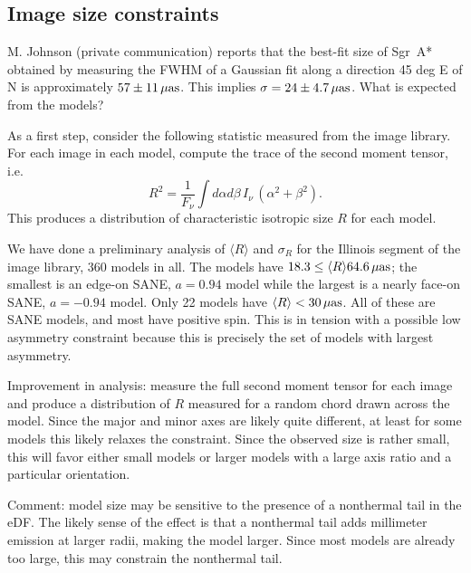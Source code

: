 \documentclass[twocolumn,tighten,dvipsnames]{aastex63}
\newcommand\sgra{Sgr~A*\xspace}
\newcommand\uas{{\rm \, \mu as}}
\newcommand\<{{\langle}}
\renewcommand\>{{\rangle}} %
\begin{document}
\subsection{Image size constraints}
\label{sec:sizeconst}

M. Johnson (private communication) reports that the best-fit size of \sgra obtained by measuring the FWHM of a Gaussian fit along a direction 45 deg E of N is approximately $57 \pm 11 \uas$.  This implies $\sigma = 24 \pm 4.7 \uas$.  What is expected from the models?

As a first step, consider the following statistic measured from the image library.  For each image in each model, compute the trace of the second moment tensor, i.e.
\begin{equation}
    R^2 = \frac{1}{F_\nu} \int d\alpha d\beta \, I_\nu \, (\alpha^2 + \beta^2).
\end{equation}
This produces a distribution of characteristic isotropic size $R$ for each model.

We have done a preliminary analysis of $\langle R \rangle$ and $\sigma_R$ for the Illinois segment of the image library, 360 models in all.  The models have  $18.3 \le \langle R \rangle 64.6 \uas$; the smallest is an edge-on SANE, $a = 0.94$ model while the largest is a nearly face-on SANE, $a = -0.94$ model.  Only 22 models have $\langle R \rangle < 30\uas$.  All of these are SANE models, and most have positive spin.  This is in tension with a possible low  asymmetry constraint because this is precisely the set of models with largest asymmetry.

Improvement in analysis: measure the full second moment tensor for each image and produce a distribution of $R$ measured for a random chord drawn across the model.  Since the major and minor axes are likely quite different, at least for some models \citep{2019ApJ...871...30I} this likely relaxes the constraint.  Since the observed size is rather small, this will favor either small models or larger models with a large axis ratio and a particular orientation.

Comment: model size may be sensitive to the presence of a nonthermal tail in the eDF.  The likely sense of the effect is that a nonthermal tail adds millimeter emission at larger radii, making the model larger.  Since most models are already too large, this may constrain the nonthermal tail.

\end{document}
